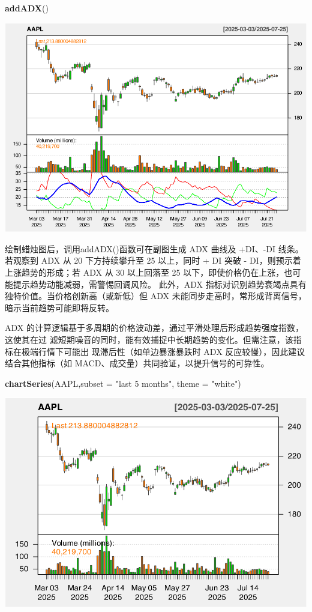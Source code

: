 \documentclass[]{ctexbook}
\newenvironment{Shaded}{\begin{snugshade}}{\end{snugshade}}
\newcommand{\AttributeTok}[1]{\textcolor[rgb]{0.13,0.29,0.53}{#1}}
\newcommand{\FunctionTok}[1]{\textcolor[rgb]{0.13,0.29,0.53}{\textbf{#1}}}
\newcommand{\NormalTok}[1]{#1}
\newcommand{\StringTok}[1]{\textcolor[rgb]{0.31,0.60,0.02}{#1}}
\begin{document}
\begin{Shaded}
\begin{Highlighting}[]
\FunctionTok{addADX}\NormalTok{()  }
\end{Highlighting}
\end{Shaded}

\includegraphics[width=0.9\linewidth]{QuantmodHandbook_files/figure-latex/adx-2}

绘制蜡烛图后，调用addADX()函数可在副图生成 ADX 曲线及 +DI、-DI 线条。若观察到 ADX
从 20 下方持续攀升至 25 以上，同时 + DI 突破 - DI，则预示着上涨趋势的形成；若 ADX
从 30 以上回落至 25 以下，即使价格仍在上涨，也可能提示趋势动能减弱，需警惕回调风险。
此外，ADX 指标对识别趋势衰竭点具有独特价值。当价格创新高（或新低）但 ADX 未能同步走高时，常形成背离信号，暗示当前趋势可能即将反转。

ADX 的计算逻辑基于多周期的价格波动差，通过平滑处理后形成趋势强度指数，这使其在过
滤短期噪音的同时，能有效捕捉中长期趋势的变化。但需注意，该指标在极端行情下可能出
现滞后性（如单边暴涨暴跌时 ADX 反应较慢），因此建议结合其他指标（如 MACD、成交量）共同验证，以提升信号的可靠性。

\begin{Shaded}
\begin{Highlighting}[]
\FunctionTok{chartSeries}\NormalTok{(AAPL,}\AttributeTok{subset =} \StringTok{"last 5 months"}\NormalTok{, }\AttributeTok{theme =} \StringTok{"white"}\NormalTok{)}
\end{Highlighting}
\end{Shaded}

\includegraphics[width=0.9\linewidth]{QuantmodHandbook_files/figure-latex/adx_2-1}
\end{document}
